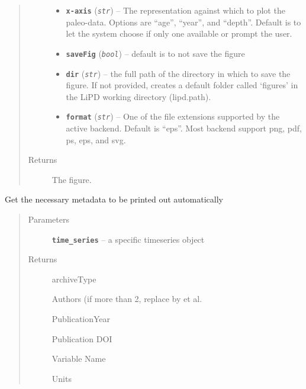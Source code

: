 \documentclass[letterpaper,10pt,english]{sphinxmanual}
\begin{document}
\begin{fulllineitems}
\begin{fulllineitems}
\begin{quote}
\begin{description}
\begin{itemize}
\item {} 
\textbf{\texttt{x-axis}} (\emph{\texttt{str}}) -- The representation against which to plot the paleo-data.
Options are ``age'', ``year'', and ``depth''. Default is to let the
system choose if only one available or prompt the user.

\item {} 
\textbf{\texttt{saveFig}} (\emph{\texttt{bool}}) -- default is to not save the figure

\item {} 
\textbf{\texttt{dir}} (\emph{\texttt{str}}) -- the full path of the directory in which to save the figure.
If not provided, creates a default folder called `figures' in the
LiPD working directory (lipd.path).

\item {} 
\textbf{\texttt{format}} (\emph{\texttt{str}}) -- One of the file extensions supported by the active
backend. Default is ``eps''. Most backend support png, pdf, ps, eps,
and svg.

\end{itemize}

\item[{Returns}] \leavevmode
The figure.

\end{description}\end{quote}

\end{fulllineitems}


\begin{fulllineitems}
\label{SummaryPlots:pyleoclim.SummaryPlots.getMetadata}
Get the necessary metadata to be printed out automatically
\begin{quote}\begin{description}
\item[{Parameters}] \leavevmode
\textbf{\texttt{time\_series}} -- a specific timeseries object

\item[{Returns}] \leavevmode

archiveType

Authors (if more than 2, replace by et al.

PublicationYear

Publication DOI

Variable Name

Units


\end{description}
\end{quote}
\end{fulllineitems}
\end{fulllineitems}
\end{document}
